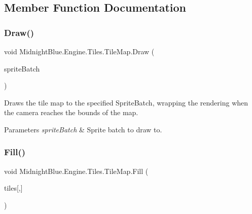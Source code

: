 \subsection{Member Function Documentation}
\hypertarget{class_midnight_blue_1_1_engine_1_1_tiles_1_1_tile_map_a5114eb9087f448be67b146f40245e7ee}{}\label{class_midnight_blue_1_1_engine_1_1_tiles_1_1_tile_map_a5114eb9087f448be67b146f40245e7ee} 
\subsubsection{\texorpdfstring{Draw()}{Draw()}}
{\footnotesize\ttfamily void Midnight\+Blue.\+Engine.\+Tiles.\+Tile\+Map.\+Draw (\begin{DoxyParamCaption}\item[{Sprite\+Batch}]{sprite\+Batch }\end{DoxyParamCaption})\hspace{0.3cm}{\ttfamily [inline]}}



Draws the tile map to the specified Sprite\+Batch, wrapping the rendering when the camera reaches the bounds of the map. 


\begin{DoxyParams}{Parameters}
{\em sprite\+Batch} & Sprite batch to draw to.\\
\hline
\end{DoxyParams}
\hypertarget{class_midnight_blue_1_1_engine_1_1_tiles_1_1_tile_map_ab2ae5b8ef2fb44d5267b8be7997ddb4c}{}\label{class_midnight_blue_1_1_engine_1_1_tiles_1_1_tile_map_ab2ae5b8ef2fb44d5267b8be7997ddb4c} 
\subsubsection{\texorpdfstring{Fill()}{Fill()}}
{\footnotesize\ttfamily void Midnight\+Blue.\+Engine.\+Tiles.\+Tile\+Map.\+Fill (\begin{DoxyParamCaption}\item[{\hyperlink{class_midnight_blue_1_1_tile}{Tile}}]{tiles\mbox{[},\mbox{]} }\end{DoxyParamCaption})\hspace{0.3cm}{\ttfamily [inline]}}



